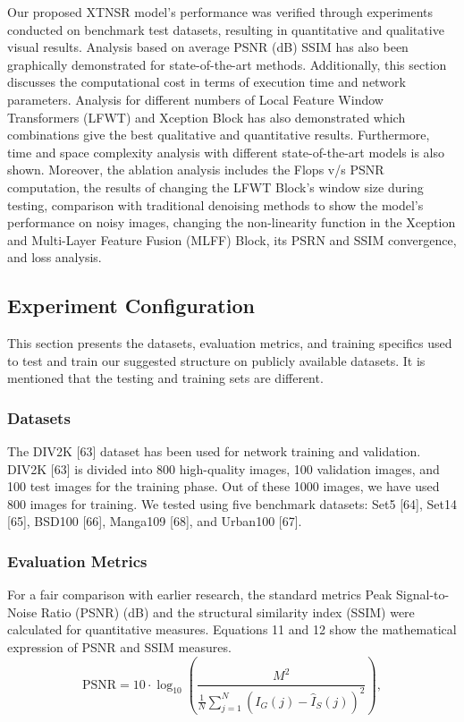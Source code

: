 \documentclass[twocolumn]{svjour3}          %
\begin{document}
Our proposed XTNSR model's performance was verified through experiments conducted on benchmark test datasets, resulting in quantitative and qualitative visual results. Analysis based on average PSNR (dB) SSIM has also been graphically demonstrated for state-of-the-art methods. Additionally, this section discusses the computational cost in terms of execution time and network parameters. Analysis for different numbers of Local Feature Window Transformers (LFWT) and Xception Block has also demonstrated which combinations give the best qualitative and quantitative results. Furthermore, time and space complexity analysis with different state-of-the-art models is also shown. Moreover, the ablation analysis includes the Flops v/s PSNR computation, the results of changing the LFWT Block's window size during testing, comparison with traditional denoising methods to show the model's performance on noisy images,  changing the non-linearity function in the Xception and Multi-Layer Feature Fusion (MLFF) Block, its PSRN and SSIM convergence, and loss analysis. 

\subsection{Experiment Configuration}
This section presents the datasets, evaluation metrics, and training specifics used to test and train our suggested structure on publicly available datasets. It is mentioned that the testing and training sets are different.

\subsubsection{Datasets} 
The DIV2K [63] dataset has been used for network training and validation. DIV2K [63] is divided into 800 high-quality images, 100 validation images, and 100 test images for the training phase. Out of these 1000 images, we have used 800 images for training. We tested using five benchmark datasets: Set5 [64], Set14 [65], BSD100 [66], Manga109 [68], and Urban100 [67].

\subsubsection{Evaluation Metrics} 
For a fair comparison with earlier research, the standard metrics Peak Signal-to-Noise Ratio (PSNR) (dB) and the structural similarity index (SSIM) were calculated for quantitative measures. Equations 11 and 12 show the mathematical expression of PSNR and SSIM measures.
\begin{equation}
\text{PSNR} = 10 \cdot \log_{10}\left(\frac{M^2}{\frac{1}{N} \sum_{j=1}^{N} (I_{G}(j) - {\hat{I}_{S}}(j))^2}\right),
\end{equation}
\end{document}
